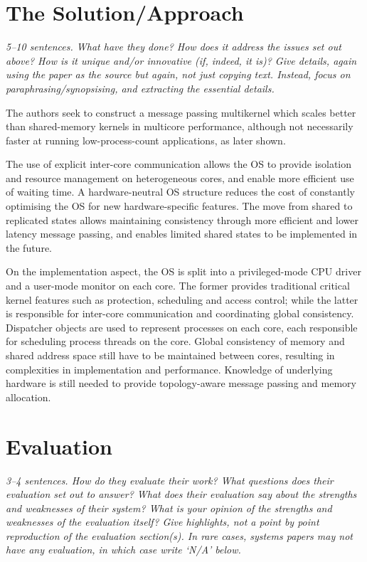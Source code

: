 \documentclass[11pt]{article}
\begin{document}
\section*{The Solution/Approach}
\textsl{5--10 sentences. What have they done? How does it address the issues set out above? How is it unique and/or innovative (if, indeed, it is)? Give details, again using the paper as the source but again, not just copying text. Instead, focus on paraphrasing/synopsising, and extracting the essential details.}

The authors seek to construct a message passing multikernel which scales better than shared-memory kernels in multicore performance, although not necessarily faster at running low-process-count applications, as later shown. 

The use of explicit inter-core communication allows the OS to provide isolation and resource management on heterogeneous cores, and enable more efficient use of waiting time. A hardware-neutral OS structure reduces the cost of constantly optimising the OS for new hardware-specific features. The move from shared to replicated states allows maintaining consistency through more efficient and lower latency message passing, and enables limited shared states to be implemented in the future.

On the implementation aspect, the OS is split into a privileged-mode CPU driver and a user-mode monitor on each core. The former provides traditional critical kernel features such as protection, scheduling and access control; while the latter is responsible for inter-core communication and coordinating global consistency. Dispatcher objects are used to represent processes on each core, each responsible for scheduling process threads on the core. Global consistency of memory and shared address space still have to be maintained between cores, resulting in complexities in implementation and performance. Knowledge of underlying hardware is still needed to provide topology-aware message passing and memory allocation.


\section*{Evaluation}
\textsl{3--4 sentences. How do they evaluate their work? What questions does their evaluation set out to answer? What does their evaluation say about the strengths and weaknesses of their system? What is your opinion of the strengths and weaknesses of the evaluation itself?  Give highlights, not a point by point reproduction of the evaluation section(s). In rare cases, systems papers may not have any evaluation, in which case write `N/A' below.}
\end{document}
